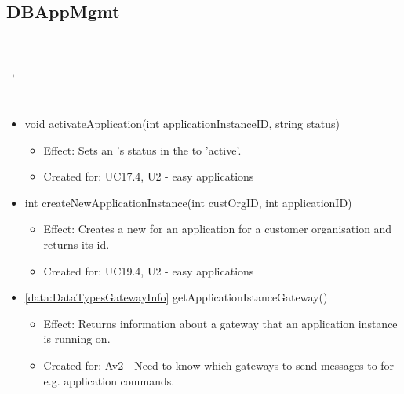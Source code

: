   \subsection{DBAppMgmt}\label{int:OtherDataDatabaseOtherDataDBDBAppMgmt}
    \begin{description}
      \item[Provided by:] \iconcomponent{}~
      \item[Required by:] \iconcomponent{}~, \iconcomponent{}~
      \item[Operations:] ~
    \begin{itemize}[noitemsep,nolistsep,leftmargin=-.25cm]
      \item \textsf{void activateApplication(int applicationInstanceID, string status)}
        \begin{itemize}[noitemsep,nolistsep]
           \item Effect: Sets an 's status in the  to 'active'.
\item Created for: UC17.4, U2 - easy applications
        \end{itemize}
      \item \textsf{int createNewApplicationInstance(int custOrgID, int applicationID)}
        \begin{itemize}[noitemsep,nolistsep]
           \item Effect: Creates a new  for an application for a customer organisation and returns its id.
\item Created for: UC19.4, U2 - easy applications
        \end{itemize}
      \item \textsf{\ref{data:DataTypesGatewayInfo} getApplicationIstanceGateway()}
        \begin{itemize}[noitemsep,nolistsep]
           \item Effect: Returns information about a gateway that an application instance is running on.
\item  Created for: Av2 - Need to know which gateways to send messages to for e.g. application commands.

\end{itemize}
\end{itemize}
\end{description}
